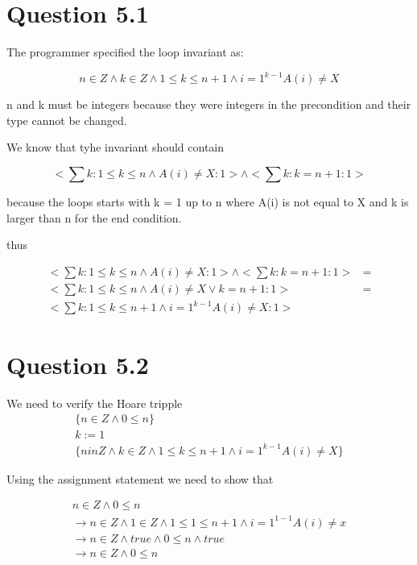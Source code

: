\documentclass[10pt,a4paper]{article}
\begin{document}
\section{Question 5.1}

The programmer specified the loop invariant as:

\begin{equation}
 n \in Z \wedge k \in Z \wedge 1\leq k \leq n+1 \wedge i = 1^{k-1}A(i)\neq X
\end{equation}

n and k must be integers because they were integers in the precondition and their type cannot be changed.

We know that tyhe invariant should contain 

\begin{equation}
 <\sum k: 1 \leq k \leq n \wedge A(i)\neq X:1> \wedge <\sum k:k=n+1:1>
\end{equation}

because the loops starts with k = 1 up to n where A(i) is not equal to X and k is larger than n for the end condition.

thus


\begin{equation}
\begin{split}
 <\sum k: 1 \leq k \leq n \wedge A(i)\neq X:1> \wedge <\sum k:k=n+1:1> &= \\
 <\sum k:1 \leq k \leq n \wedge A(i)\neq X \vee k=n+1:1 >&=\\
 <\sum k:1 \leq k \leq n +1 \wedge i = 1^{k-1}A(i)\neq X:1 >
\end{split}
\end{equation}




\section{Question 5.2}
We need to verify the Hoare tripple
\begin{equation}
\begin{split}
 \{ n \in Z \wedge 0 \leq n \} \\
 k:=1 \\
 \{ n in Z \wedge k\in Z \wedge 1 \leq k \leq n+1 \wedge i = 1^{k-1}A(i)\neq X \}
\end{split}
\end{equation}


Using the assignment statement we need to show that

\begin{equation}
\begin{split}
 n \in Z \wedge 0 \leq n \\
 \rightarrow n \in Z \wedge 1 \in Z \wedge 1 \leq 1\leq n+1 \wedge i = 1^{1-1}A(i)\neq x\\
 \rightarrow n \in Z \wedge true \wedge 0 \leq n \wedge true\\
 \rightarrow n \in Z \wedge 0 \leq n\\
\end{split}
 \end{equation}
 
\end{document}

